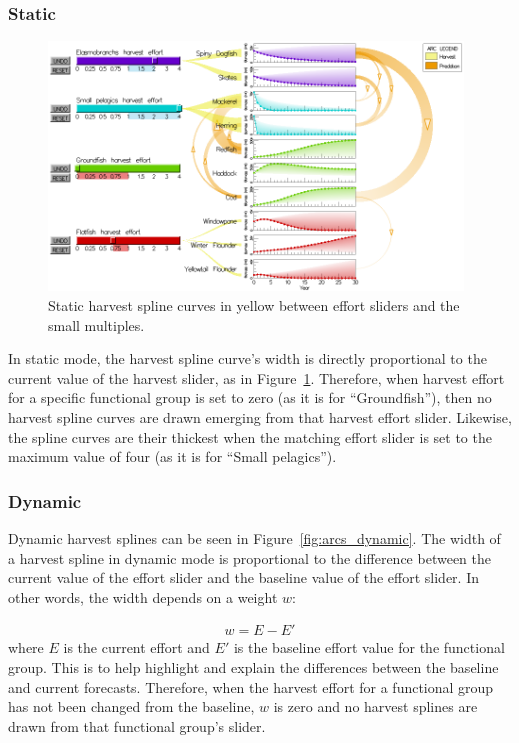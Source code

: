 \subsubsection{Static}

\begin{figure}[h]
	\centering
	\includegraphics[width=0.98\textwidth]{figures/png/harvest_splines.png}
	\caption{Static harvest spline curves in yellow between effort sliders and the small multiples.}
	\label{fig:harvest_splines}
\end{figure}

In static mode, the harvest spline curve's width is directly proportional to the current value of the harvest slider, as in Figure~\ref{fig:harvest_splines}.  Therefore, when harvest effort for a specific functional group is set to zero (as it is for ``Groundfish''), then no harvest spline curves are drawn emerging from that harvest effort slider.  Likewise, the spline curves are their thickest when the matching effort slider is set to the maximum value of four (as it is for ``Small pelagics'').

\subsubsection{Dynamic}

Dynamic harvest splines can be seen in Figure~\ref{fig:arcs_dynamic}.  The width of a harvest spline in dynamic mode is proportional to the difference between the current value of the effort slider and the baseline value of the effort slider.  In other words, the width depends on a weight $w$:

\begin{align}
w = E - E'
\end{align}
where $E$ is the current effort and $E'$ is the baseline effort value for the functional group.  This is to help highlight and explain the differences between the baseline and current forecasts.   Therefore, when the harvest effort for a functional group has not been changed from the baseline, $w$ is zero and no harvest splines are drawn from that functional group's slider.

